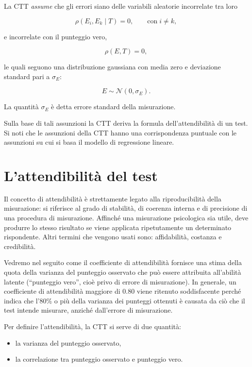\documentclass[
  11pt,
]{krantz}
\providecommand{\tightlist}{%
  \setlength{\itemsep}{0pt}\setlength{\parskip}{0pt}}
\theoremstyle{definition}
\theoremstyle{definition}
\theoremstyle{definition}
\theoremstyle{definition}
\theoremstyle{remark}
\begin{document}
La CTT \emph{assume} che gli errori siano delle variabili aleatorie incorrelate tra loro

\[
\rho(E_i, E_k \mid T) = 0, \qquad\text{con}\; i \neq k,
\]

e incorrelate con il punteggio vero,

\[
\rho(E, T) = 0,
\]

le quali seguono una distribuzione gaussiana con media zero e deviazione standard pari a \(\sigma_E\):

\[
E \sim \mathcal{N}(0, \sigma_E).
\]

La quantità \(\sigma_E\) è detta errore standard della misurazione.

Sulla base di tali assunzioni la CTT deriva la formula dell'attendibilità di un test. Si noti che le assunzioni della CTT hanno una corrispondenza puntuale con le assunzioni su cui si basa il modello di regressione lineare.

\hypertarget{lattendibilituxe0-del-test}{%
\section{L'attendibilità del test}\label{lattendibilituxe0-del-test}}

Il concetto di attendibilità è strettamente legato alla riproducibilità della misurazione: si riferisce al grado di stabilità, di coerenza interna e di precisione di una procedura di misurazione. Affinché una misurazione psicologica sia utile, deve produrre lo stesso risultato se viene applicata ripetutamente un determinato rispondente. Altri termini che vengono usati sono: affidabilità, costanza e credibilità.

Vedremo nel seguito come il coefficiente di attendibilità fornisce una stima della quota della varianza del punteggio osservato che può essere attribuita all'abilità latente (``punteggio vero'', cioè privo di errore di misurazione). In generale, un coefficiente di attendibilità maggiore di 0.80 viene ritenuto soddisfacente perché indica che l'80\% o più della varianza dei punteggi ottenuti è causata da ciò che il test intende misurare, anziché dall'errore di misurazione.

Per definire l'attendibilità, la CTT si serve di due quantità:

\begin{itemize}
\tightlist
\item
  la varianza del punteggio osservato,
\item
  la correlazione tra punteggio osservato e punteggio vero.
\end{itemize}
\end{document}
